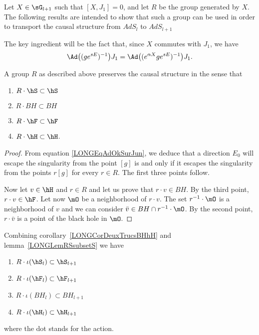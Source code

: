Let $X\in\sG_{l+1}$ such that $[X,J_1]=0$, and let $R$ be the group generated by $X$. The following results are intended to show that such a group can be used in order to transport the causal structure from $AdS_l$ to $AdS_{l+1}$

The key ingredient will be the fact that, since $X$ commutes with $J_1$, we have
\begin{equation}        \label{LONGEqAdOkSurJun}
	\Ad\big( (g e^{sE})^{-1} \big)J_1=\Ad\big( ( e^{\alpha X}g e^{sE})^{-1} \big)J_1.
\end{equation}

\begin{lemma}        \label{LONGLemRSsubsetS}
	A group $R$ as described above preserves the causal structure in the sense that
	\begin{multicols}{2}
		\begin{enumerate}

			\item
			      $R\cdot\hS\subset\hS$
			\item
			      $R\cdot BH\subset BH$
			\item
			      $R\cdot \hF\subset\hF$
			\item
			      $R\cdot \hH\subset\hH$.

		\end{enumerate}
	\end{multicols}
\end{lemma}

\begin{proof}
	From equation \eqref{LONGEqAdOkSurJun}, we deduce that a direction $E_0$ will escape the singularity from the point $[g]$ is and only if it escapes the singularity from the points $r[g]$ for every $r\in R$. The first three points follow.

	Now let $v\in\hH$ and $r\in R$ and let us prove that $r\cdot v\in BH$. By the third point, $r\cdot v\in\hF$. Let now $\mO$ be a neighborhood of $r\cdot v$. The set $r^{-1}\cdot \mO$ is a neighborhood of $v$ and we can consider $\bar v\in BH\cap r^{-1}\cdot\mO$. By the second point, $r\cdot \bar v$ is a point of the black hole in $\mO$.
\end{proof}

\begin{remark}        \label{LONGRemdqnqRSlsubsetSlpu}
	Combining corollary~\ref{LONGCorDeuxTrucsBHhH} and lemma~\ref{LONGLemRSsubsetS} we have
	\begin{multicols}{2}
		\begin{enumerate}
			\item
			      $ R\cdot\iota(\hS_l)\subset\hS_{l+1}$
			\item
			      $ R\cdot\iota(\hF_l)\subset\hF_{l+1}$
			\item
			      $ R\cdot\iota(BH_{l})\subset BH_{l+1}$
			\item
			      $ R\cdot\iota(\hH_{l})\subset\hH_{l+1}$
		\end{enumerate}
	\end{multicols}
	where the dot stands for the action.
\end{remark}


